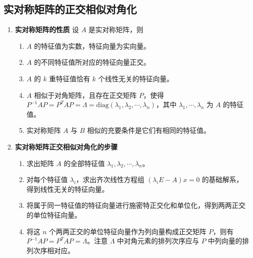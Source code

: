 \documentclass[UTF8]{ctexart}
\theoremstyle{mydef}
\begin{document}
\subsection{实对称矩阵的正交相似对角化}
\begin{enumerate}
    \item \textbf{实对称矩阵的性质}
    设 $A$ 是实对称矩阵，则
    \begin{enumerate}
        \item $A$ 的特征值为实数，特征向量为实向量。
        \item $A$ 的不同特征值所对应的特征向量正交。
        \item $A$ 的 $k$ 重特征值恰有 $k$ 个线性无关的特征向量。
        \item $A$ 相似于对角矩阵，且存在正交矩阵 $P$，使得 $P^{-1}AP = P^T AP = \Lambda = \text{diag}(\lambda_1, \lambda_2, \cdots, \lambda_n)$，其中 $\lambda_1, \cdots, \lambda_n$ 为 $A$ 的特征值。
        \item 实对称矩阵 $A$ 与 $B$ 相似的充要条件是它们有相同的特征值。
    \end{enumerate}
    \item \textbf{实对称矩阵正交相似对角化的步骤}
    \begin{enumerate}
        \item 求出矩阵 $A$ 的全部特征值 $\lambda_1, \lambda_2, \cdots, \lambda_n$。
        \item 对每个特征值 $\lambda_i$，求出齐次线性方程组 $(\lambda_i E - A)x=0$ 的基础解系，得到线性无关的特征向量。
        \item 将属于同一特征值的特征向量进行施密特正交化和单位化，得到两两正交的单位特征向量。
        \item 将这 $n$ 个两两正交的单位特征向量作为列向量构成正交矩阵 $P$，则有 $P^{-1}AP = P^T AP = \Lambda$。注意 $\Lambda$ 中对角元素的排列次序应与 $P$ 中列向量的排列次序相对应。
    \end{enumerate}
\end{enumerate}
\end{document}
